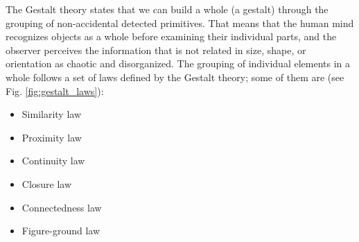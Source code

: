 The Gestalt theory \citep{Wertheimer:Psycologische:1923} states that we can build a whole (a gestalt) through the grouping of non-accidental detected primitives. That means that the human mind recognizes objects as a whole before examining their individual parts, and the observer perceives the information that is not related in size, shape, or orientation as chaotic and disorganized. The grouping of individual elements in a whole follows a set of laws defined by the Gestalt theory; some of them are (see Fig. \ref{fig:gestalt_laws}):

\begin{itemize}
	\item Similarity law
	\item Proximity law
	\item Continuity law
	\item Closure law
	\item Connectedness law
	\item Figure-ground law	
\end{itemize}


